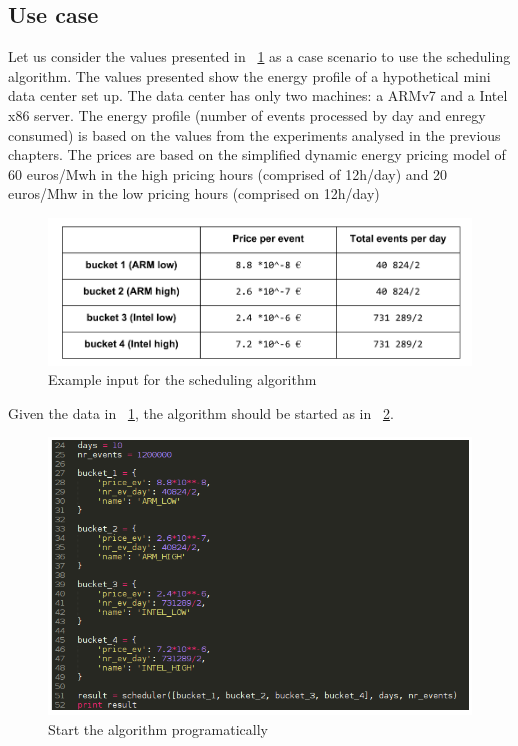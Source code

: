 \subsection*{Use case}

Let us consider the values presented in ~\ref{fig:input_table} as a case scenario to use the scheduling algorithm. The values presented show the energy profile of a hypothetical mini data center set up. The data center has only two machines: a ARMv7 and a Intel x86 server. The energy profile (number of events processed by day and enregy consumed) is based on the values from the experiments analysed in the previous chapters. The prices are based on the simplified dynamic energy pricing model of 60 euros/Mwh in the high pricing hours (comprised of 12h/day) and 20 euros/Mhw in the low pricing hours (comprised on 12h/day)

\begin{figure}[h]
  \centering
    \includegraphics[width=150mm]{"img/input_table"}
    \caption{Example input for the scheduling algorithm}
    \label{fig:input_table}
\end{figure}

Given the data in ~\ref{fig:input_table}, the algorithm should be started as in ~\ref{fig:scheduler_code_init}.

\begin{figure}[h]
  \centering
    \includegraphics[width=150mm]{"img/scheduler_code_init"}
    \caption{Start the algorithm programatically}
    \label{fig:scheduler_code_init}
\end{figure}

